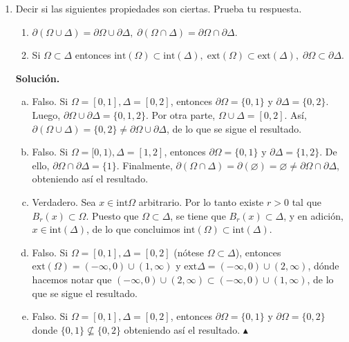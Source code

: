 \documentclass[12pt]{article}
\newcommand{\Ext}{\mathrm{ext}}
\newcommand{\Int}{\mathrm{int}}
\begin{document}
\begin{enumerate}
\newpage
\item Decir si las siguientes propiedades son ciertas. Prueba tu respuesta.
\begin{enumerate}[(1)]
\item $\partial(\Omega\cup \Delta) = \partial \Omega\cup \partial \Delta,\; 
\partial(\Omega\cap \Delta) = \partial \Omega\cap \partial \Delta$.
\item Si $\Omega\subset \Delta$ entonces $\Int(\Omega)\subset \Int(\Delta),\; \Ext(\Omega)\subset \Ext(\Delta),\; \partial \Omega\subset \partial \Delta$.
\end{enumerate}
\textbf{Solución.}
\begin{enumerate}[(a)]
    \item Falso. Si $\Omega=[0,1],\Delta=[0,2]$, entonces $\partial\Omega=\{0,1\}$ y $\partial\Delta=\{0,2\}$. Luego, $\partial\Omega\cup\partial\Delta=\{0,1,2\}$.
    Por otra parte, $\Omega \cup \Delta=[0,2]$. Así, $\partial(\Omega\cup\Delta)=\{0,2\}\neq \partial\Omega\cup\partial\Delta$, de lo que se sigue el resultado.
    \item Falso. Si $\Omega=[0,1),\Delta=[1,2]$, entonces $\partial\Omega=\{0,1\}$ y $\partial\Delta=\{1,2\}$. De ello, $\partial\Omega\cap\partial\Delta=\{1\}$. Finalmente,
    $\partial(\Omega\cap\Delta)=\partial(\varnothing)=\varnothing\neq \partial\Omega\cap\partial\Delta$, obteniendo así el resultado.
    \item Verdadero. Sea $x \in \text{int}\Omega$ arbitrario. Por lo tanto existe $r>0$ tal que $B_r(x)\subset \Omega$. Puesto que $\Omega \subset \Delta$, se tiene que $B_r(x)\subset \Delta$,
    y en adición, $x \in \text{int}(\Delta)$, de lo que concluimos $\text{int}(\Omega)\subset \text{int}(\Delta)$.
    \item Falso. Si $\Omega=[0,1],\Delta=[0,2]$ (nótese $\Omega\subset \Delta$), entonces $\text{ext}(\Omega)=(-\infty,0)\cup (1,\infty)$ y $\text{ext}\Delta=(-\infty,0)\cup (2,\infty)$, dónde hacemos notar que
    $(-\infty,0)\cup (2,\infty)\subset (-\infty,0)\cup (1,\infty)$, de lo que se sigue el resultado.
    \item Falso. Si $\Omega=[0,1],\Delta=[0,2]$, entonces $\partial\Omega=\{0,1\}$ y $\partial\Omega=\{0,2\}$ donde $\{0,1\}\nsubseteq \{0,2\}$ obteniendo así el resultado. $\blacktriangle$
\end{enumerate}


\end{enumerate}
\end{document}
